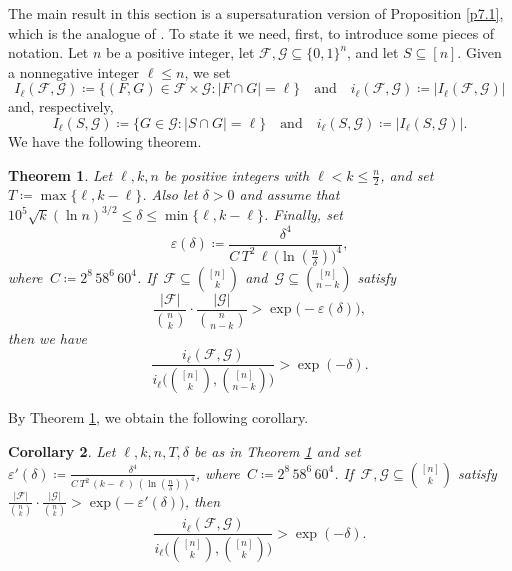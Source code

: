 \documentclass[10pt,a4paper]{amsart}
\newtheorem{thm}{Theorem}[section]
\newtheorem{cor}[thm]{Corollary}
\theoremstyle{remark}
\newcommand{\ee}{\varepsilon}
\newcommand{\mik}{\leqslant}
\newcommand{\Fcal}{\mathcal{F}}
\newcommand{\Gcal}{\mathcal{G}}
\begin{document}
The main result in this section is a supersaturation version of Proposition \ref{p7.1},
which is the analogue of \cite[Theorem 1.14]{FR87}. To state it we need, first,
to introduce some pieces of notation. Let $n$ be a positive integer, let
$\Fcal,\Gcal\subseteq \{0,1\}^n$, and let $S\subseteq [n]$.
Given a nonnegative integer $\ell\mik n$, we set
\begin{equation} \label{e9.1}
I_\ell(\Fcal,\Gcal)\coloneqq \big\{(F,G)\in\Fcal\times\Gcal: |F\cap G|=\ell\big\}
\ \ \ \text{ and } \ \ \ i_\ell(\Fcal,\Gcal)\coloneqq |I_\ell(\Fcal,\Gcal)|
\end{equation}
and, respectively,
\begin{equation} \label{e9.2}
I_\ell(S,\Gcal)\coloneqq \big\{G\in\Gcal: |S\cap G|=\ell\big\}
\ \ \ \text{ and } \ \ \ i_\ell(S,\Gcal)\coloneqq |I_\ell(S,\Gcal)|.
\end{equation}
We have the following theorem.
\begin{thm} \label{t9.1}
Let $\ell,k,n$ be positive integers with $\ell< k\mik \frac{n}{2}$, and set $T\coloneqq \max\{\ell,k-\ell\}$.
Also let $\delta>0$ and assume that $10^5 \sqrt{k} (\ln n)^{3/2}\mik \delta \mik \min\{\ell,k-\ell\}$. Finally, set
\begin{equation} \label{e9.3}
\ee(\delta)\coloneqq \frac{\delta^4}{C\, T^2\, \ell\,\big(\ln(\frac{n}{\delta})\big)^4},
\end{equation}
where\, $C\coloneqq 2^{8}\, 58^6\, 60^4$. If\, $\Fcal\subseteq\binom{[n]}{k}$ and\,
$\Gcal\subseteq \binom{[n]}{n-k}$ satisfy
\begin{equation} \label{e9.4}
\frac{|\Fcal|}{\binom{n}{k}}\cdot\frac{|\Gcal|}{\binom{n}{n-k}}>\exp\big(-\ee(\delta)\big),
\end{equation}
then we have
\begin{equation} \label{e9.5}
\frac{i_{\ell}(\Fcal,\Gcal)}{i_{\ell}\big(\binom{[n]}{k},\binom{[n]}{n-k}\big)}> \exp\left(-\delta\right).
\end{equation}
\end{thm}
By Theorem \ref{t9.1}, we obtain the following corollary.
\begin{cor} \label{9.cor.new}
Let $\ell,k,n, T, \delta$ be as in Theorem \emph{\ref{t9.1}} and set
$\ee'(\delta)\coloneqq \frac{\delta^4}{C\, T^2\, (k-\ell)\,(\ln(\frac{n}{\delta}))^4}$,
where\, $C\coloneqq 2^{8}\, 58^6\, 60^4$. If\, $\Fcal, \Gcal\subseteq\binom{[n]}{k}$ satisfy
$\frac{|\Fcal|}{\binom{n}{k}}\cdot\frac{|\Gcal|}{\binom{n}{k}}>\exp\big(-\ee'(\delta)\big)$, then
\begin{equation} \label{en.9.1}
\frac{i_{\ell}(\Fcal,\Gcal)}{i_{\ell}\big(\binom{[n]}{k},\binom{[n]}{k}\big)}> \exp\left(-\delta\right).
\end{equation}
\end{cor}
\end{document}
